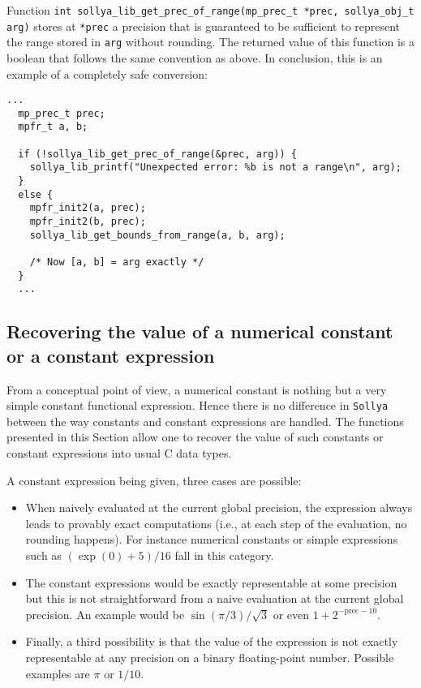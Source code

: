 \documentclass[a4paper]{article}
\newcommand{\sollya}{\texttt{Sollya}\xspace}
\begin{document}
Function  \verb|int sollya_lib_get_prec_of_range(mp_prec_t *prec, sollya_obj_t arg)| stores at \verb|*prec| a precision that is guaranteed to be sufficient to represent the range stored in \verb|arg| without rounding. The returned value of this function is a boolean that follows the same convention as above. In conclusion, this is an example of a completely safe conversion:

\begin{center}\begin{minipage}{15cm}\begin{Verbatim}[frame=single]
  ...
  mp_prec_t prec;
  mpfr_t a, b;

  if (!sollya_lib_get_prec_of_range(&prec, arg)) {
    sollya_lib_printf("Unexpected error: %b is not a range\n", arg);
  }
  else {
    mpfr_init2(a, prec);
    mpfr_init2(b, prec);
    sollya_lib_get_bounds_from_range(a, b, arg);

    /* Now [a, b] = arg exactly */
  }
  ...
\end{Verbatim}
\end{minipage}\end{center}

\subsection{Recovering the value of a numerical constant or a constant expression}
From a conceptual point of view, a numerical constant is nothing but a very simple constant functional expression. Hence there is no difference in \sollya between the way constants and constant expressions are handled. The functions presented in this Section allow one to recover the value of such constants or constant expressions into usual C data types.

A constant expression being given, three cases are possible:
\begin{itemize}
\item When naively evaluated at the current global precision, the expression always leads to provably exact computations (i.e., at each step of the evaluation, no rounding happens). For instance numerical constants or simple expressions such as $(\exp(0)+5)/16$ fall in this category.
\item The constant expressions would be exactly representable at some precision but this is not straightforward from a naive evaluation at the current global precision. An example would be $\sin(\pi/3)/\sqrt{3}$ or even $1 + 2^{-\textrm{prec}-10}$.
\item Finally, a third possibility is that the value of the expression is not exactly representable at any precision on a binary floating-point number. Possible examples are $\pi$ or $1/10$.
\end{itemize}
\end{document}
